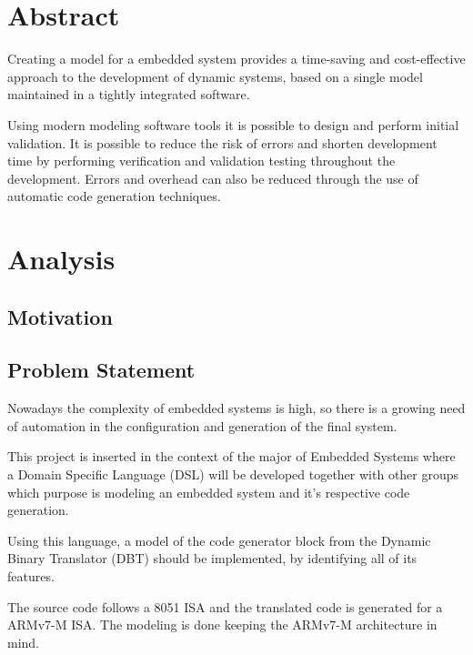 \documentclass{report}
\begin{document}
	\newpage
	\tableofcontents
	
	\newpage
	
    
    \chapter{Abstract}
    
    \par Creating a model for a embedded system provides a time-saving and cost-effective approach to the development of dynamic systems, based on a single model maintained in a tightly integrated software. 
    \par Using modern modeling software tools it is possible to design and perform initial validation. It is possible to reduce the risk of errors and shorten development time by performing verification and validation testing throughout the development. Errors and overhead can also be reduced through the use of automatic code generation techniques\cite{modelling-embsys}.
   
	\chapter{Analysis}
	
	\par 
    
    \section{Motivation}
    
    \par 
    
    \section{Problem Statement}
    
    \par Nowadays the complexity of embedded systems is high, so there is a growing need of automation in the configuration and generation of the final system.
	\par This project is inserted in the context of the major of Embedded Systems where a Domain Specific Language (DSL) will be developed together with other groups which purpose is modeling an embedded system and it’s respective code generation. 
	\par Using this language, a model of the code generator block from the Dynamic Binary Translator (DBT) should be implemented, by identifying all of its features.
    \par The source code follows a 8051 ISA and the translated code is generated for a ARMv7-M ISA. The modeling is done keeping the ARMv7-M architecture in mind.
\end{document}
